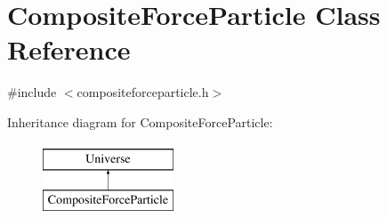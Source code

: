 \hypertarget{classCompositeForceParticle}{}\section{Composite\+Force\+Particle Class Reference}
\label{classCompositeForceParticle}


{\ttfamily \#include $<$compositeforceparticle.\+h$>$}

Inheritance diagram for Composite\+Force\+Particle\+:\begin{figure}[H]
\begin{center}
\leavevmode
\includegraphics[height=2.000000cm]{classCompositeForceParticle}
\end{center}
\end{figure}
